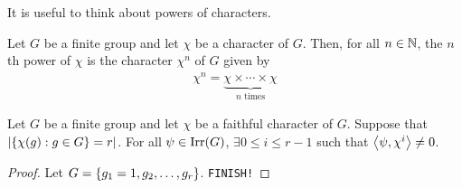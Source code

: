 It is useful to think about powers of characters.

\begin{boxnotation}
    Let $G$ be a finite group and let $\chi$ be a character of $G$. Then, for all $n \in \mathbb{N}$, the $n$th power of $\chi$ is the character $\chi^n$ of $G$ given by
    \begin{align*}
        \chi^n = \underbrace{\chi \times \cdots \times \chi}_{n \text{ times}}
    \end{align*}
\end{boxnotation}

\begin{theorem}
    Let $G$ be a finite group and let $\chi$ be a faithful character of $G$. Suppose that $\left\lvert \left\{ \chi(g) : g \in G \right\} = r \right\rvert$. For all $\psi \in \operatorname{Irr}\!\left( G \right)$, $\exists 0 \leq i \leq r - 1$ such that $\left\langle \psi, \chi^i \right\rangle \neq 0$.
\end{theorem}
\begin{proof}
    Let $G = \left\{ g_1 = 1, g_2, \ldots, g_r \right\}$. \verb|FINISH!|
\end{proof}